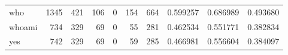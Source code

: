 \begin{longtable}{lrrrrrrrrr}
who       &                                               1345 &                                                421 &                                                106 &                                                  0 &                                                154 &                                                664 &                                           0.599257 &                               0.686989 &                             0.493680 \\
whoami    &                                                734 &                                                329 &                                                 69 &                                                  0 &                                                 55 &                                                281 &                                           0.462534 &                               0.551771 &                             0.382834 \\
yes       &                                                742 &                                                329 &                                                 69 &                                                  0 &                                                 59 &                                                285 &                                           0.466981 &                               0.556604 &                             0.384097 \\
\end{longtable}
